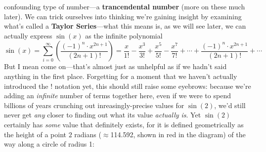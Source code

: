 \documentclass[10pt]{article}
\theoremstyle{definition}
\begin{document}
{confounding type of number---a \textbf{trancendental number} (more on
these much later).  We can trick ourselves into thinking we're gaining
insight by examining what's called a \textbf{Taylor Series}---what
this means is, as we will see later, we can actually express $\sin(x)$
as the infinite polynomial
\[\sin(x) = \sum_{i=0}^\infty\left(\frac{(-1)^n\cdot
      x^{2n+1}}{(2n+1)!}\right) = \frac{x}{1!} - \frac{x^3}{3!} +
  \frac{x^5}{5!} - \frac{x^7}{7!} + \cdots + \frac{(-1)^n\cdot
    x^{2n+1}}{(2n+1)!} + \cdots \]
But I mean come on---that's almost just as unhelpful as if we hadn't
said anything in the first place.  Forgetting for a moment that we
haven't actually introduced the $!$ notation yet, this should still
raise some eyebrows: because we're adding an \emph{infinite} number of
terms together here, even if we were to spend billions of years
crunching out inreasingly-precise values for $\sin(2)$, we'd still
never get \emph{any} closer to finding out what its value
\emph{actually is}.  Yet $\sin(2)$ certainly has \emph{some} value
that definitely exists, for it is defined geometrically as the height
of a point $2$ radians ($\approx$114.592\textdegree, shown in red in
the diagram) of the way along a circle of radius 1:
\begin{figure}[H]
\centering
{}
\end{figure}}
\end{document}

